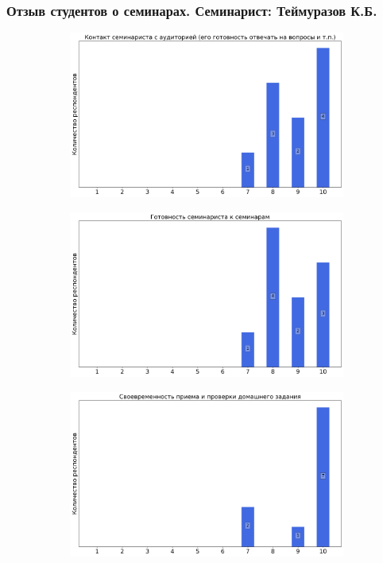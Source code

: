     \subsubsection{Отзыв студентов о семинарах. Семинарист: Теймуразов К.Б.}
		\begin{figure}[H]
			\centering
			\begin{subfigure}[b]{0.45\textwidth}
				\centering
				\includegraphics[width=\textwidth]{images/1 course/Дискретный анализ/seminarists-marks-Теймуразов К.Б.-0.png}
			\end{subfigure}
			\begin{subfigure}[b]{0.45\textwidth}
				\centering
				\includegraphics[width=\textwidth]{images/1 course/Дискретный анализ/seminarists-marks-Теймуразов К.Б.-1.png}
			\end{subfigure}
			\begin{subfigure}[b]{0.45\textwidth}
				\centering
				\includegraphics[width=\textwidth]{images/1 course/Дискретный анализ/seminarists-marks-Теймуразов К.Б.-2.png}

\end{subfigure}
\end{figure}
